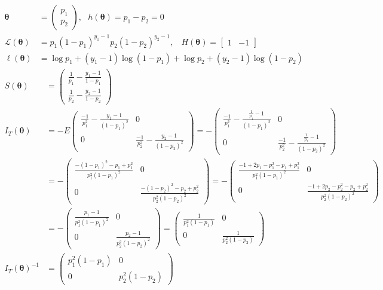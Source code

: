\documentclass[
  letterpaper,
  DIV=11,
  numbers=noendperiod]{scrreprt}
\begin{document}
\[\begin{aligned}
\boldsymbol \theta &= \begin{pmatrix} p_1 \\p_2 \end{pmatrix}, ~~~ h(\boldsymbol \theta) =p_1-p_2 = 0 \\
\mathcal L(\boldsymbol \theta) &= p_1(1-p_1)^{y_1-1}p_2(1-p_2)^{y_2-1},~~~~ H(\boldsymbol \theta) = \begin{bmatrix} 1 & -1 \end{bmatrix}
\\
\mathcal \ell(\boldsymbol \theta) &= \log p_1 + (y_1-1)\log(1-p_1) +\log p_2+ (y_2-1)\log(1-p_2)
\end{aligned}
\] \[\begin{aligned}
S(\boldsymbol \theta) &= \begin{pmatrix} \frac 1 {p_1}- \frac{y_1-1}{1-p_1} \\ \frac 1 {p_2}- \frac{y_2-1}{1-p_2} \end{pmatrix} \\
I_T(\boldsymbol \theta) &= -E\begin{pmatrix} \frac {-1} {p_1^2}- \frac{y_1-1}{(1-p_1)^2} & 0 \\ 0& \frac {-1} {p_2^2}- \frac{y_2-1}{(1-p_2)^2} \end{pmatrix} =-\begin{pmatrix} \frac {-1} {p_1^2}- \frac{\frac{1}{p_1}-1}{(1-p_1)^2} & 0 \\ 0& \frac {-1} {p_2^2}- \frac{\frac{1}{p_2}-1}{(1-p_2)^2} \end{pmatrix} \\
&=-\begin{pmatrix} \frac {-(1-p_1)^2-p_1+p_1^2}{p_1^2(1-p_1)^2}& 0 \\ 0& \frac {-(1-p_2)^2-p_2+p_2^2}{p_2^2(1-p_2)^2} \end{pmatrix}=-\begin{pmatrix} \frac {-1+2p_1-p_1^2-p_1+p_1^2}{p_1^2(1-p_1)^2}& 0 \\ 0& \frac {-1+2p_2 - p_2^2-p_2+p_2^2}{p_2^2(1-p_2)^2} \end{pmatrix} \\
&=-\begin{pmatrix} \frac {p_1-1}{p_1^2(1-p_1)^2}& 0 \\ 0& \frac {p_2-1}{p_2^2(1-p_2)^2} \end{pmatrix}
=\begin{pmatrix} \frac {1}{p_1^2(1-p_1)}& 0 \\ 0& \frac {1}{p_2^2(1-p_2)} \end{pmatrix} \\
I_T(\boldsymbol \theta)^{-1} &=  \begin{pmatrix} p_1^2(1-p_1)& 0 \\ 0& p_2^2(1-p_2) \end{pmatrix}
\end{aligned}\]
\end{document}
